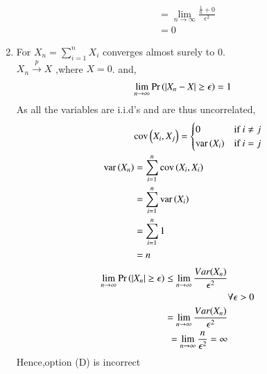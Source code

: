\documentclass[journal,12pt,Twocolumn]{IEEEtran}
\theoremstyle{remark}
\begin{document}
\begin{enumerate}[label=(\Alph*)]
\begin{align}
&=\lim_{n \to \infty} \frac{\frac{1}{n}+0}{\epsilon^2} \\
&= 0
\end{align} 
\item For $X_n = \sum_{i=1}^n X_i$ converges almost surely to $0$. \\
$X_n \xrightarrow{p} X$ ,where $X=0$.
and,
\begin{align}
\lim_{n \to \infty} \Pr\left(|X_n - X| \geq  \epsilon\right) = 1 
\end{align}
As all the variables are i.i.d's and are thus uncorrelated,
\begin{align}
&\text{cov}\left(X_i, X_j\right) =
\begin{cases}
	0 & \text{if } i \ne j\\
    \text{var}\left(X_i\right) & \text{if } i = j
\end{cases} \\
\text{var}\left(X_n\right)&=\sum_{i=1}^{n}\text{cov}\left(X_i, X_i\right) \\
&= \sum_{i=1}^{n} \text{var}\left(X_i\right)\\
&= \sum_{i=1}^{n} 1\\
&= n
\end{align}
\begin{align}
\lim_{n \to \infty} \Pr\left(|X_n| \geq  \epsilon\right)  
\leq \lim_{n \to \infty} \frac{Var(X_n)}{\epsilon^2} \\
& \forall \epsilon > 0 \\
=\lim_{n \to \infty} \frac{Var(X_n)}{\epsilon^2} \\
=\lim_{n \to \infty} \frac{n}{\epsilon^2} = \infty
\end{align} 
Hence,option (D) is incorrect
\end{enumerate}
\end{document}

